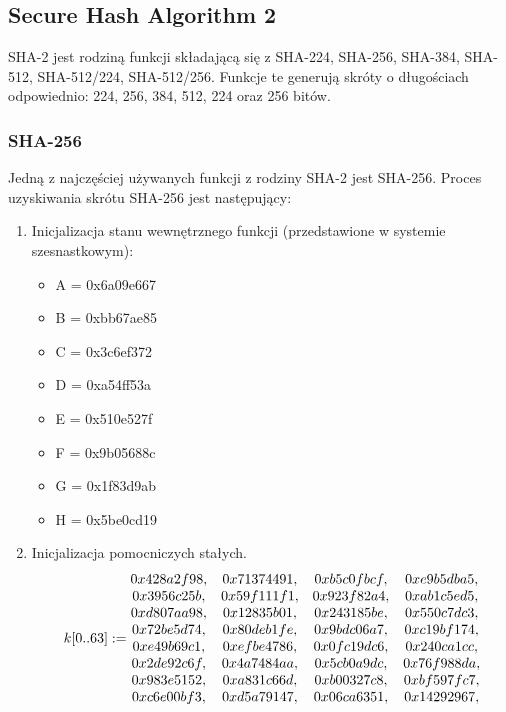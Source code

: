 \subsection{Secure Hash Algorithm 2}
SHA-2 jest rodziną funkcji składającą się z \mbox{SHA-224}, \mbox{SHA-256}, \mbox{SHA-384}, \mbox{SHA-512}, \mbox{SHA-512/224}, \mbox{SHA-512/256}. Funkcje te generują skróty o długościach odpowiednio: 224, 256, 384, 512, 224 oraz 256 bitów.

\subsubsection{SHA-256}
Jedną z najczęściej używanych funkcji z rodziny SHA-2 jest SHA-256. Proces uzyskiwania skrótu SHA-256 jest następujący:
\begin{enumerate}
	\item Inicjalizacja stanu wewnętrznego funkcji (przedstawione w systemie szesnastkowym):
		\begin{itemize}
			\item A = 0x6a09e667
			\item B = 0xbb67ae85
			\item C = 0x3c6ef372
			\item D = 0xa54ff53a
			\item E = 0x510e527f
			\item F = 0x9b05688c
			\item G = 0x1f83d9ab
			\item H = 0x5be0cd19
		\end{itemize}
	\item Inicjalizacja pomocniczych stałych. \\
			$$
			k[0..63] := \\
			\begin{matrix}
				0x428a2f98, & 0x71374491, & 0xb5c0fbcf, & 0xe9b5dba5, \\
				0x3956c25b, & 0x59f111f1, & 0x923f82a4, & 0xab1c5ed5, \\
				0xd807aa98, & 0x12835b01, & 0x243185be, & 0x550c7dc3, \\
				0x72be5d74, & 0x80deb1fe, & 0x9bdc06a7, & 0xc19bf174, \\
				0xe49b69c1, & 0xefbe4786, & 0x0fc19dc6, & 0x240ca1cc, \\
				0x2de92c6f, & 0x4a7484aa, & 0x5cb0a9dc, & 0x76f988da, \\
				0x983e5152, & 0xa831c66d, & 0xb00327c8, & 0xbf597fc7, \\
				0xc6e00bf3, & 0xd5a79147, & 0x06ca6351, & 0x14292967, \\

\end{matrix}$$
\end{enumerate}
